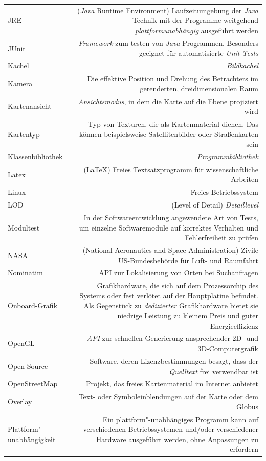 \documentclass[10pt]{scrreprt}
\newcommand{\textref}[1]{\mbox{\raisebox{0.1ex}{\small$\rightarrow$ }\textit{#1}}}
\begin{document}
\begin{longtabu}{L{0.35} R{1.65}}
JRE & (\textref{Java} Runtime Environment) Laufzeitumgebung der \textref{Java} Technik mit der Programme weitgehend \textref{plattformunabhängig} ausgeführt werden\\
JUnit & \textref{Framework} zum testen von \textref{Java}-Programmen. Besonders geeignet für automatisierte \textref{Unit-Tests}\\
Kachel & \textref{Bildkachel}\\
Kamera & Die effektive Position und Drehung des Betrachters im gerenderten, dreidimensionalen Raum\\
Kartenansicht & \textref{Ansichtsmodus}, in dem die Karte auf die Ebene projiziert wird\\
Kartentyp & Typ von Texturen, die als Kartenmaterial dienen. Das können beispielsweise Satellitenbilder oder Straßenkarten sein\\
Klassenbibliothek & \textref{Programmbibliothek}\\
Latex & (\LaTeX) Freies Textsatzprogramm für wissenschaftliche Arbeiten\\
Linux & Freies Betriebssystem\\
LOD & (Level of Detail) \textref{Detaillevel} \\
Modultest & In der Softwareentwicklung angewendete Art von Tests, um einzelne Softwaremodule auf korrektes Verhalten und Fehlerfreiheit zu prüfen\\
NASA & (National Aeronautics and Space Administration) Zivile US-Bundesbehörde für Luft- und Raumfahrt\\
Nominatim & API zur Lokalisierung von Orten bei Suchanfragen\\
Onboard-Grafik & Grafikhardware, die sich auf dem Prozessorchip des Systems oder fest verlötet auf der Hauptplatine befindet. Als Gegenstück zu \textit{dedizierter} Grafikhardware bietet sie niedrige Leistung zu kleinem Preis und guter Energieeffizienz\\
OpenGL & \textref{API} zur schnellen Generierung ansprechender 2D- und 3D-Computergrafik\\
Open-Source & Software, deren Lizenzbestimmungen besagt, dass der \textref{Quelltext} frei verwendbar ist\\
OpenStreetMap & Projekt, das freies Kartenmaterial im Internet anbietet\\
Overlay & Text- oder Symboleinblendungen auf der Karte oder dem Globus\\
Plattform"-unabhängigkeit & Ein plattform"-unabhängiges Programm kann auf verschiedenen Betriebssystemen  und/oder verschiedener Hardware ausgeführt werden, ohne Anpassungen zu erfordern\\

\end{longtabu}
\end{document}
